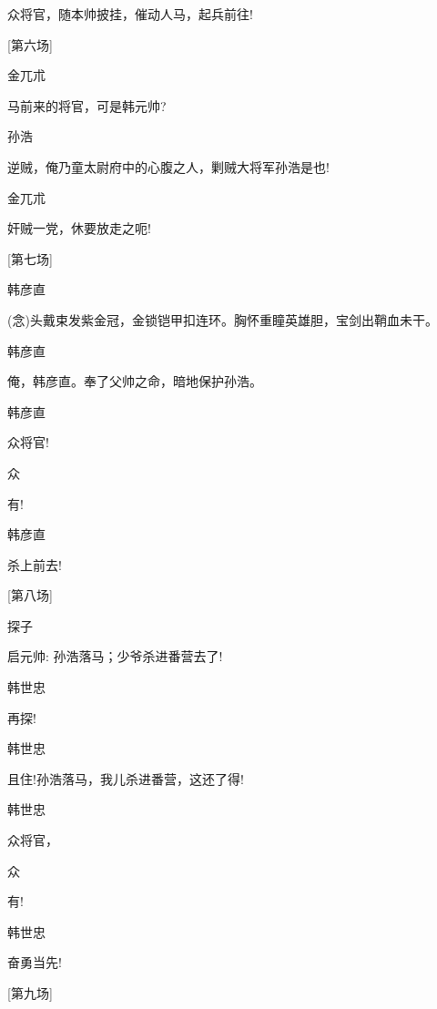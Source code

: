 {{{{众将官，随本帅披挂，催动人马，起兵前往!}

{{[}第六场{]}}

{金兀朮\hspace{20pt}~

马前来的将官，可是韩元帅?}

{孙浩\hspace{30pt}~

逆贼，俺乃童太尉府中的心腹之人，剿贼大将军孙浩是也!}

{金兀朮\hspace{20pt}~

奸贼一党，休要放走之呃!}

{{[}第七场{]}}

{韩彦直

({\akai 念})头戴束发紫金冠，金锁铠甲扣连环。胸怀重瞳英雄胆，宝剑出鞘血未干。}

{韩彦直\hspace{20pt}~

俺，韩彦直。奉了父帅之命，暗地保护孙浩。}

{韩彦直\hspace{20pt}~

众将官!}

{众\hspace{40pt}~

有!}

{韩彦直\hspace{20pt}~

杀上前去!}

{{[}第八场{]}}

{探子\hspace{30pt}~

启元帅: 孙浩落马；少爷杀进番营去了!}

{韩世忠\hspace{20pt}~

再探!}

{韩世忠\hspace{20pt}~

且住!孙浩落马，我儿杀进番营，这还了得!}

{韩世忠\hspace{20pt}~

众将官，}

{众\hspace{40pt}~

有!}

{韩世忠\hspace{20pt}~

奋勇当先!}

{{[}第九场{]}}

}}}
